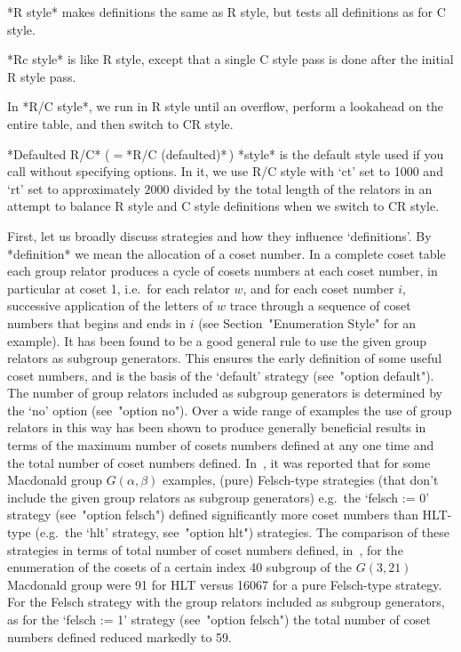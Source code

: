 *R\* style* makes definitions the  same
as R style, but tests all definitions as for C style.

*Rc style* is like R style, except that a
single C style pass is done after the initial R style pass.

In *R/C style*, we run in R style until
an overflow, perform a lookahead on the entire table, and then  switch
to CR style.

*Defaulted R/C*
($={}$*R/C    (defaulted)*$\,$) *style* is the default style used if you  call
{\ACE} without specifying options. In it, we use R/C style  with  `ct'
set to 1000 and `rt' set to approximately $2000$ divided by the  total
length of the relators in an attempt to balance R style  and  C  style
definitions when we switch to CR style.


First, let us  broadly  discuss  strategies  and  how  they  influence
\lq{}definitions'.  By  *definition*  we  mean   the
allocation of a coset number. In a complete  coset  table  each  group
relator produces a cycle of cosets numbers at each  coset  number,  in
particular at coset 1, i.e.~for each relator $w$, and for  each  coset
number $i$, successive application of the letters of $w$ trace through
a sequence  of  coset  numbers  that  begins  and  ends  in  $i$  (see
Section~"Enumeration Style" for an example). It has been found to be a
good general  rule  to  use  the  given  group  relators  as  subgroup
generators. This ensures the early definition  of  some  useful  coset
numbers, and is the  basis  of  the  `default'  strategy  (see~"option
default").  The  number  of  group  relators  included   as   subgroup
generators is determined by the `no' option (see~"option no"). Over  a
wide range of examples the use of group relators in this way has  been
shown to produce generally beneficial results in terms of the  maximum
number of cosets numbers defined at any one time and the total  number
of coset numbers defined. In~\cite{CDHW73}, it was reported  that  for
some Macdonald group $G(\alpha,\beta)$  examples,  (pure)  Felsch-type
strategies (that don't include the given group  relators  as  subgroup
generators) e.g.~the `felsch  :=  0'  strategy  (see~"option  felsch")
defined significantly more coset numbers than HLT-type (e.g.~the `hlt'
strategy,  see~"option  hlt")  strategies.  The  comparison  of  these
strategies  in  terms  of  total  number  of  coset  numbers  defined,
in~\cite{Hav91}, for the enumeration of the cosets of a certain  index
40 subgroup of the $G(3,21)$ Macdonald group were 91  for  HLT  versus
16067 for a pure Felsch-type strategy. For the  Felsch  strategy  with
the group relators included as subgroup generators, as for the `felsch
:= 1' strategy (see~"option felsch") the total number of coset numbers
defined reduced markedly to 59.

